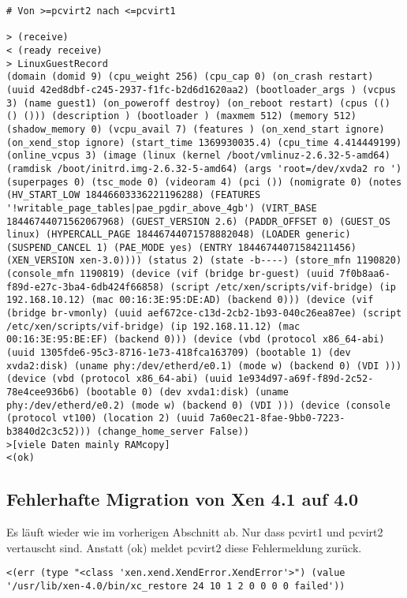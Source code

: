 \setupVerbatimOut
\begin{verbatim}
# Von >=pcvirt2 nach <=pcvirt1

> (receive)
< (ready receive)
> LinuxGuestRecord
(domain (domid 9) (cpu_weight 256) (cpu_cap 0) (on_crash restart) (uuid 42ed8dbf-c245-2937-f1fc-b2d6d1620aa2) (bootloader_args ) (vcpus 3) (name guest1) (on_poweroff destroy) (on_reboot restart) (cpus (() () ())) (description ) (bootloader ) (maxmem 512) (memory 512) (shadow_memory 0) (vcpu_avail 7) (features ) (on_xend_start ignore) (on_xend_stop ignore) (start_time 1369930035.4) (cpu_time 4.414449199) (online_vcpus 3) (image (linux (kernel /boot/vmlinuz-2.6.32-5-amd64) (ramdisk /boot/initrd.img-2.6.32-5-amd64) (args 'root=/dev/xvda2 ro ') (superpages 0) (tsc_mode 0) (videoram 4) (pci ()) (nomigrate 0) (notes (HV_START_LOW 18446603336221196288) (FEATURES '!writable_page_tables|pae_pgdir_above_4gb') (VIRT_BASE 18446744071562067968) (GUEST_VERSION 2.6) (PADDR_OFFSET 0) (GUEST_OS linux) (HYPERCALL_PAGE 18446744071578882048) (LOADER generic) (SUSPEND_CANCEL 1) (PAE_MODE yes) (ENTRY 18446744071584211456) (XEN_VERSION xen-3.0)))) (status 2) (state -b----) (store_mfn 1190820) (console_mfn 1190819) (device (vif (bridge br-guest) (uuid 7f0b8aa6-f89d-e27c-3ba4-6db424f66858) (script /etc/xen/scripts/vif-bridge) (ip 192.168.10.12) (mac 00:16:3E:95:DE:AD) (backend 0))) (device (vif (bridge br-vmonly) (uuid aef672ce-c13d-2cb2-1b93-040c26ea87ee) (script /etc/xen/scripts/vif-bridge) (ip 192.168.11.12) (mac 00:16:3E:95:BE:EF) (backend 0))) (device (vbd (protocol x86_64-abi) (uuid 1305fde6-95c3-8716-1e73-418fca163709) (bootable 1) (dev xvda2:disk) (uname phy:/dev/etherd/e0.1) (mode w) (backend 0) (VDI ))) (device (vbd (protocol x86_64-abi) (uuid 1e934d97-a69f-f89d-2c52-78e4cee936b6) (bootable 0) (dev xvda1:disk) (uname phy:/dev/etherd/e0.2) (mode w) (backend 0) (VDI ))) (device (console (protocol vt100) (location 2) (uuid 7a60ec21-8fae-9bb0-7223-b3840d2c3c52))) (change_home_server False))
>[viele Daten mainly RAMcopy]
<(ok)
\end{verbatim}

\subsection{Fehlerhafte Migration von Xen 4.1 auf 4.0}

Es läuft wieder wie im vorherigen Abschnitt ab. Nur dass pcvirt1 und pcvirt2 vertauscht sind. Anstatt (ok) meldet pcvirt2 diese Fehlermeldung zurück.
\setupVerbatimOut
\begin{verbatim}
<(err (type "<class 'xen.xend.XendError.XendError'>") (value '/usr/lib/xen-4.0/bin/xc_restore 24 10 1 2 0 0 0 0 failed'))
\end{verbatim}

